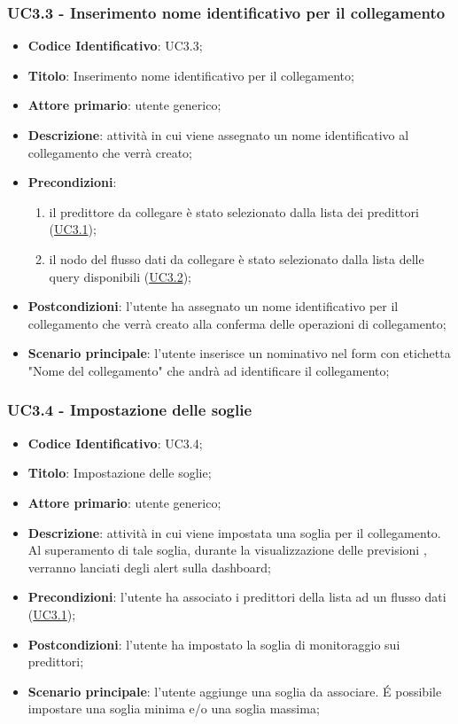 	\subsubsection{UC3.3 - Inserimento nome identificativo per il collegamento}
		\begin{itemize}
			\item\textbf{Codice Identificativo}: UC3.3;
			\item\textbf{Titolo}: Inserimento nome identificativo per il collegamento;
			\item\textbf{Attore primario}: utente generico;
			\item\textbf{Descrizione}: attività in cui viene assegnato un nome identificativo al collegamento che verrà creato;
			\item\textbf{Precondizioni}:
				\begin{enumerate}
					\item il predittore da collegare è stato selezionato dalla lista dei predittori (\hyperref[par:UC3.1]{UC3.1});
					\item il nodo del flusso dati da collegare è stato selezionato dalla lista delle query disponibili (\hyperref[par:UC3.2]{UC3.2});
					
				\end{enumerate}
			\item\textbf{Postcondizioni}: l'utente ha assegnato un nome identificativo per il collegamento che verrà creato alla conferma delle operazioni di collegamento;
		
			\item\textbf{Scenario principale}: l'utente inserisce un nominativo nel form con etichetta "Nome del collegamento" che andrà ad identificare il collegamento;
		\end{itemize}
			

	\label{par:UC3.4}
	\subsubsection{UC3.4 - Impostazione delle soglie}
		\begin{itemize}
			\item\textbf{Codice Identificativo}: UC3.4;
			\item\textbf{Titolo}: Impostazione delle soglie;
			\item\textbf{Attore primario}: utente generico;
			\item\textbf{Descrizione}: attività in cui viene impostata una soglia per il collegamento. Al superamento di tale soglia, durante la visualizzazione delle previsioni , verranno lanciati degli alert sulla dashboard;
			\item\textbf{Precondizioni}: l'utente ha associato i predittori della lista ad un flusso dati (\hyperref[par:UC3.1]{UC3.1});
			\item\textbf{Postcondizioni}: l'utente ha impostato la soglia di monitoraggio sui predittori;
			\item\textbf{Scenario principale}: l'utente aggiunge una soglia da associare. \'E possibile impostare una soglia minima e/o una soglia massima;
		\end{itemize}


